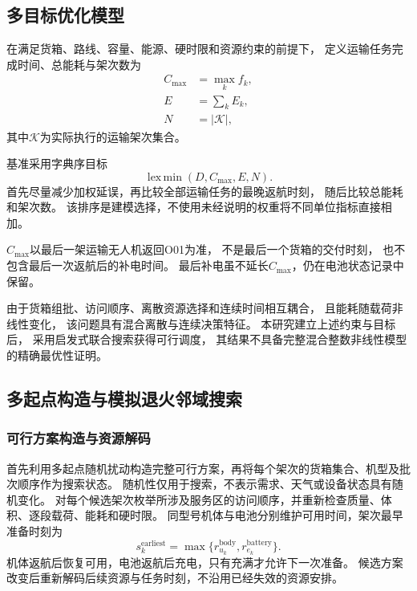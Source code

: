 \documentclass[bwprint]{gmcmthesis}
\begin{document}
\subsection{多目标优化模型}

在满足货箱、路线、容量、能源、硬时限和资源约束的前提下，
定义运输任务完成时间、总能耗与架次数为
\begin{align}
    C_{\max}&=\max_k f_k,\\
    E&=\sum_k E_k,\\
    N&=|\mathcal{K}|,
\end{align}
其中$\mathcal{K}$为实际执行的运输架次集合。

基准采用字典序目标
\begin{equation}
    \operatorname{lex\,min}
    \left(D,C_{\max},E,N\right).
    \label{eq:q2_objective}
\end{equation}
首先尽量减少加权延误，再比较全部运输任务的最晚返航时刻，
随后比较总能耗和架次数。
该排序是建模选择，不使用未经说明的权重将不同单位指标直接相加。

$C_{\max}$以最后一架运输无人机返回O01为准，
不是最后一个货箱的交付时刻，
也不包含最后一次返航后的补电时间。
最后补电虽不延长$C_{\max}$，仍在电池状态记录中保留。

由于货箱组批、访问顺序、离散资源选择和连续时间相互耦合，
且能耗随载荷非线性变化，
该问题具有混合离散与连续决策特征。
本研究建立上述约束与目标后，
采用启发式联合搜索获得可行调度，
其结果不具备完整混合整数非线性模型的精确最优性证明。

\subsection{多起点构造与模拟退火邻域搜索}
\subsubsection{可行方案构造与资源解码}
首先利用多起点随机扰动构造完整可行方案，再将每个架次的货箱集合、机型及批次顺序作为搜索状态。
随机性仅用于搜索，不表示需求、天气或设备状态具有随机变化。
对每个候选架次枚举所涉及服务区的访问顺序，并重新检查质量、体积、逐段载荷、能耗和硬时限。
同型号机体与电池分别维护可用时间，架次最早准备时刻为
\begin{equation}
s_k^{\mathrm{earliest}}=\max\{r_{u_k}^{\mathrm{body}},r_{e_k}^{\mathrm{battery}}\}.
\end{equation}
机体返航后恢复可用，电池返航后充电，只有充满才允许下一次准备。
候选方案改变后重新解码后续资源与任务时刻，不沿用已经失效的资源安排。
\end{document}
